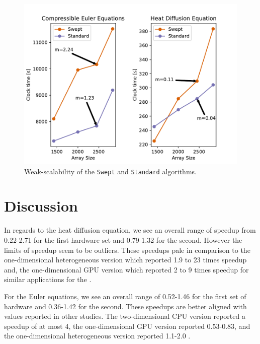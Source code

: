 \documentclass[preprints,article,accept,moreauthors,pdftex]{Definitions/mdpi}
\def\Swept{\texttt{Swept}}
\def\Standard{\texttt{Standard}}
\newcommand\fs{0.7}
\begin{document}
\begin{figure}[H]
    
    \begin{center}
        \includegraphics[scale=\fs, trim={0.1cm 0.25cm 1cm 0.5cm},clip]{figs/weakScalability.pdf}
        \caption{Weak-scalability of the \Swept{} and \Standard{} algorithms.}
        \label{fig:scalability}
    \end{center}
\end{figure}




\section{Discussion}
\label{discussion-section}
In regards to the heat diffusion equation, we see an overall range of speedup from 0.22-2.71 for the first hardware set and 0.79-1.32 for the second. However the limits of speedup seem to be outliers. These speedups pale in comparison to the one-dimensional heterogeneous version which reported 1.9 to 23 times speedup and, the one-dimensional GPU version which reported 2 to 9 times speedup for similar applications for the  \cite{Magee2018AcceleratingDecomposition,Magee2020ApplyingSystems}. 

For the Euler equations, we see an overall range of 0.52-1.46 for the first set of hardware and 0.36-1.42 for the second. These speedups are better aligned with values reported in other studies. The two-dimensional CPU version reported a speedup of at most 4, the one-dimensional GPU version reported 0.53-0.83, and the one-dimensional heterogeneous version reported 1.1-2.0 \cite{Alhubail2018ThePDEs,Magee2018AcceleratingDecomposition,Magee2020ApplyingSystems}.
\end{document}
